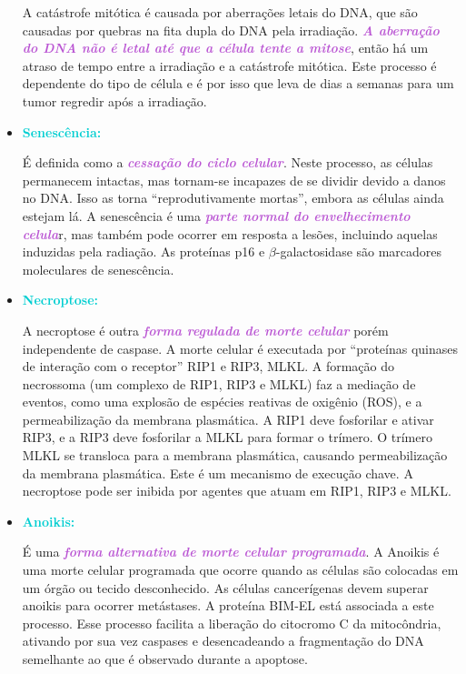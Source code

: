 \documentclass[11pt,a4paper]{article}
\begin{document}
\begin{itemize}[label=\textcolor{CarnationPink}{$\blacktriangleright$}]
		A catástrofe mitótica é causada por aberrações letais do DNA, que são causadas por quebras na fita dupla do DNA pela irradiação. \textcolor{MediumOrchid}{\textbf{\textit{A aberração do DNA não é letal até que a célula tente a mitose}}}, então há um atraso de tempo entre a irradiação e a catástrofe mitótica. Este processo é dependente do tipo de célula e é por isso que leva de dias a semanas para um tumor regredir após a irradiação.
		
		\item \textcolor{DarkTurquoise}{\LobsterTwo\Large\textbf{Senescência:}}
		
		É definida como a \textcolor{MediumOrchid}{\textbf{\textit{cessação do ciclo celular}}}. Neste processo, as células permanecem intactas, mas tornam-se incapazes de se dividir devido a danos no DNA. Isso as torna “reprodutivamente mortas”, embora as células ainda estejam lá. A senescência é uma \textcolor{MediumOrchid}{\textbf{\textit{parte normal do envelhecimento celula}}}r, mas também pode ocorrer em resposta a lesões, incluindo aquelas induzidas pela radiação. As proteínas p16 e $\beta$-galactosidase são marcadores moleculares de senescência.

		\item \textcolor{DarkTurquoise}{\LobsterTwo\Large\textbf{Necroptose:}}
		
		A necroptose é outra \textcolor{MediumOrchid}{\textbf{\textit{forma regulada de morte celular}}} porém independente de caspase. A morte celular é executada por “proteínas quinases de interação com o receptor” RIP1 e RIP3, MLKL. A formação do necrossoma (um complexo de RIP1, RIP3 e MLKL) faz a mediação de eventos, como uma explosão de espécies reativas de oxigênio (ROS), e a permeabilização da membrana plasmática. A RIP1 deve fosforilar e ativar RIP3, e a RIP3 deve fosforilar a MLKL para formar o trímero. O trímero MLKL se transloca para a membrana plasmática, causando permeabilização da membrana plasmática. Este é um mecanismo de execução chave. A necroptose pode ser inibida por agentes que atuam em RIP1, RIP3 e MLKL.

		\item \textcolor{DarkTurquoise}{\LobsterTwo\Large\textbf{Anoikis:}}
		
		É uma \textcolor{MediumOrchid}{\textbf{\textit{forma alternativa de morte celular programada}}}. A Anoikis é uma morte celular programada que ocorre quando as células são colocadas em um órgão ou tecido desconhecido. As células cancerígenas devem superar anoikis para ocorrer metástases. A proteína BIM-EL está associada a este processo. Esse processo facilita a liberação do citocromo C da mitocôndria, ativando por sua vez caspases e desencadeando a fragmentação do DNA semelhante ao que é observado durante a apoptose.
	\end{itemize}
\end{document}
